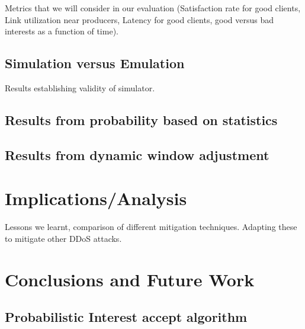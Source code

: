 \documentclass[conference]{IEEEtran}
\begin{document}
Metrics that we will consider in our evaluation (Satisfaction rate for good clients, Link utilization near producers, Latency for good clients, good versus bad interests as a function of time).

\subsection{Simulation versus Emulation}
Results establishing validity of  simulator.

\subsection{Results from probability based on statistics}

\subsection{Results from dynamic window adjustment}

\section{Implications/Analysis}
Lessons we learnt, comparison of different mitigation techniques. 
Adapting these to mitigate other DDoS attacks.

\section{Conclusions and Future Work}




\appendix










\subsection{Probabilistic Interest accept algorithm}
\end{document}
